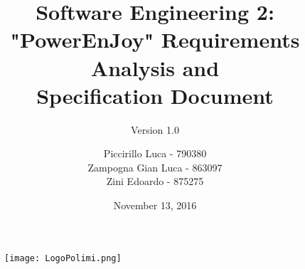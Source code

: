 \documentclass{scrartcl}
\title{Software Engineering 2: "PowerEnJoy"\newline\newline
Requirements Analysis and\\Specification Document}
\subtitle{Version 1.0}
\author{Piccirillo Luca - 790380\\
Zampogna Gian Luca - 863097\\
Zini Edoardo - 875275}
\date{November 13, 2016}
\begin{document}
\begin{figure} [h!]
    \centering
    \texttt{[image: LogoPolimi.png]}
    \label{fig:LogoPolimi}
    \maketitle
\end{figure}
\newpage
{}
\tableofcontents
\newpage
{}


\newpage

\newpage

\newpage

\newpage

\end{document}

